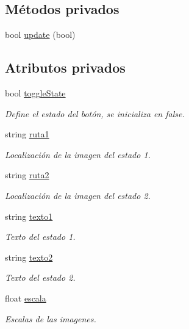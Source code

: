 \subsection*{Métodos privados}
\begin{DoxyCompactItemize}
\item 
bool \hyperlink{classboton_toggle_ae0c7f301bb81bf8e813be7273e09ce3d}{update} (bool)
\end{DoxyCompactItemize}
\subsection*{Atributos privados}
\begin{DoxyCompactItemize}
\item 
bool \hyperlink{classboton_toggle_a16e1fc2e8c6b3bfc76f1de28f9623740}{toggle\+State}
\begin{DoxyCompactList}\small\item\em Define el estado del botón, se inicializa en false. \end{DoxyCompactList}\item 
string \hyperlink{classboton_toggle_acd9a4699cc7fcb3facda61450bafa25f}{ruta1}
\begin{DoxyCompactList}\small\item\em Localización de la imagen del estado 1. \end{DoxyCompactList}\item 
string \hyperlink{classboton_toggle_a29e4c1705e45c20f62a77176b7b2ae2d}{ruta2}
\begin{DoxyCompactList}\small\item\em Localización de la imagen del estado 2. \end{DoxyCompactList}\item 
string \hyperlink{classboton_toggle_abd3f33fb266429ad6697518506bedce8}{texto1}
\begin{DoxyCompactList}\small\item\em Texto del estado 1. \end{DoxyCompactList}\item 
string \hyperlink{classboton_toggle_a838680f64548815ecac688f7bd3cb59c}{texto2}
\begin{DoxyCompactList}\small\item\em Texto del estado 2. \end{DoxyCompactList}\item 
float \hyperlink{classboton_toggle_aec530290e05f262e49cd41ea80914bfb}{escala}
\begin{DoxyCompactList}\small\item\em Escalas de las imagenes. \end{DoxyCompactList}\item 

\end{DoxyCompactItemize}
